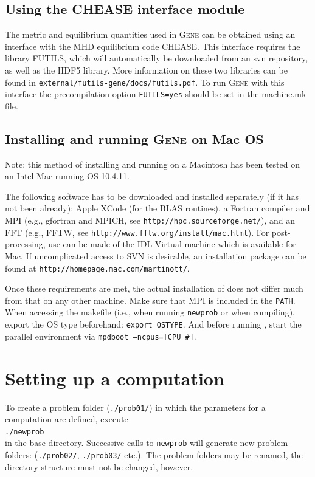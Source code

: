 \documentclass[12pt]{article}
\begin{document}
\subsection{Using the CHEASE interface module}
The metric and equilibrium quantities used in \textsc{Gene} can be obtained using an
interface with the MHD equilibrium code CHEASE. This interface requires the
library FUTILS, which will automatically be downloaded from an svn repository, as well
as the HDF5 library. More information on these two libraries can be found  in 
\texttt{external/futils-gene/docs/futils.pdf}. To run \textsc{Gene} with this interface
the precompilation option \texttt{FUTILS=yes} should be set in the
machine.mk file.

\subsection{Installing and running \textsc{Gene} on Mac OS}

Note: this method of installing and running \gene on a Macintosh has
been tested on an Intel Mac running OS 10.4.11.

The following software has to be downloaded and installed separately
(if it has not been already): Apple XCode (for the BLAS routines), a
Fortran compiler and MPI (e.g., gfortran and MPICH, see
\texttt{http://hpc.sourceforge.net/}), and an FFT (e.g., FFTW, see
\texttt{http://www.fftw.org/install/mac.html}). For post-processing, use
can be made of the IDL Virtual machine which is available for Mac. If
uncomplicated access to SVN is desirable, an installation package can
be found at \texttt{http://homepage.mac.com/martinott/}.

Once these requirements are met, the actual installation of \gene does
not differ much from that on any other machine. Make sure that MPI is
included in the \texttt{PATH}. When accessing the makefile (i.e., when
running \texttt{newprob} or when compiling), export the OS type
beforehand: \texttt{export OSTYPE}. And before running \gene, start
the parallel environment via \texttt{mpdboot --ncpus=[CPU \#]}.

\newpage


\section{Setting up a computation}

To create a problem folder (\texttt{./prob01/}) in which the parameters for a computation are defined,
execute \\
\qquad\verb|./newprob| \\
in the \gene base directory. Successive calls to \verb|newprob| will generate new problem folders:
(\texttt{./prob02/}, \texttt{./prob03/} etc.). The problem folders may be renamed, the directory
structure must not be changed, however.
\end{document}
